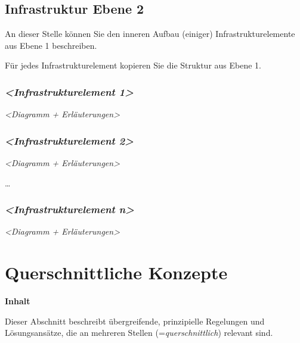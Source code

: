 \documentclass[
]{article}
\begin{document}
\hypertarget{_infrastruktur_ebene_2}{%
\subsection{Infrastruktur Ebene 2}\label{_infrastruktur_ebene_2}}

An dieser Stelle können Sie den inneren Aufbau (einiger)
Infrastrukturelemente aus Ebene 1 beschreiben.

Für jedes Infrastrukturelement kopieren Sie die Struktur aus Ebene 1.

\hypertarget{__emphasis_infrastrukturelement_1_emphasis}{%
\subsubsection{\texorpdfstring{\emph{\textless Infrastrukturelement
1\textgreater{}}}{\textless Infrastrukturelement 1\textgreater{}}}\label{__emphasis_infrastrukturelement_1_emphasis}}

\emph{\textless Diagramm + Erläuterungen\textgreater{}}

\hypertarget{__emphasis_infrastrukturelement_2_emphasis}{%
\subsubsection{\texorpdfstring{\emph{\textless Infrastrukturelement
2\textgreater{}}}{\textless Infrastrukturelement 2\textgreater{}}}\label{__emphasis_infrastrukturelement_2_emphasis}}

\emph{\textless Diagramm + Erläuterungen\textgreater{}}

\ldots{}

\hypertarget{__emphasis_infrastrukturelement_n_emphasis}{%
\subsubsection{\texorpdfstring{\emph{\textless Infrastrukturelement
n\textgreater{}}}{\textless Infrastrukturelement n\textgreater{}}}\label{__emphasis_infrastrukturelement_n_emphasis}}

\emph{\textless Diagramm + Erläuterungen\textgreater{}}

\hypertarget{section-concepts}{%
\section{Querschnittliche Konzepte}\label{section-concepts}}

\textbf{Inhalt}

Dieser Abschnitt beschreibt übergreifende, prinzipielle Regelungen und
Lösungsansätze, die an mehreren Stellen (=\emph{querschnittlich})
relevant sind.
\end{document}
